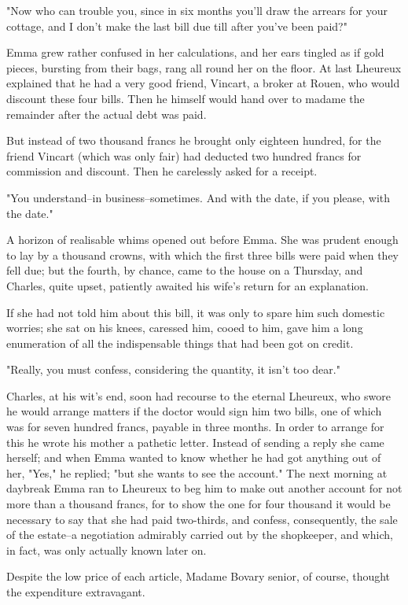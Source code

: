 \documentclass[11pt,twocolumn]{ltugboat}
\begin{document}
"Now who can trouble you, since in six months you'll draw the arrears
for your cottage, and I don't make the last bill due till after you've
been paid?"

Emma grew rather confused in her calculations, and her ears tingled
as if gold pieces, bursting from their bags, rang all round her on
the floor. At last Lheureux explained that he had a very good friend,
Vincart, a broker at Rouen, who would discount these four bills. Then
he himself would hand over to madame the remainder after the actual debt
was paid.

But instead of two thousand francs he brought only eighteen hundred, for
the friend Vincart (which was only fair) had deducted two hundred francs
for commission and discount. Then he carelessly asked for a receipt.

"You understand--in business--sometimes. And with the date, if you
please, with the date."

A horizon of realisable whims opened out before Emma. She was prudent
enough to lay by a thousand crowns, with which the first three bills
were paid when they fell due; but the fourth, by chance, came to the
house on a Thursday, and Charles, quite upset, patiently awaited his
wife's return for an explanation.

If she had not told him about this bill, it was only to spare him such
domestic worries; she sat on his knees, caressed him, cooed to him, gave
him a long enumeration of all the indispensable things that had been got
on credit.

"Really, you must confess, considering the quantity, it isn't too dear."

Charles, at his wit's end, soon had recourse to the eternal Lheureux,
who swore he would arrange matters if the doctor would sign him two
bills, one of which was for seven hundred francs, payable in three
months. In order to arrange for this he wrote his mother a pathetic
letter. Instead of sending a reply she came herself; and when Emma
wanted to know whether he had got anything out of her, "Yes," he
replied; "but she wants to see the account." The next morning at
daybreak Emma ran to Lheureux to beg him to make out another account for
not more than a thousand francs, for to show the one for four thousand
it would be necessary to say that she had paid two-thirds, and confess,
consequently, the sale of the estate--a negotiation admirably carried
out by the shopkeeper, and which, in fact, was only actually known later
on.

Despite the low price of each article, Madame Bovary senior, of course,
thought the expenditure extravagant.
\end{document}
